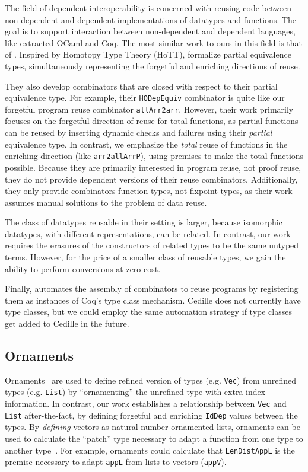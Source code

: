 \documentclass[acmsmall]{acmart}\settopmatter{}
\begin{document}
The field of dependent interoperability is concerned with reusing code
between non-dependent and dependent implementations of datatypes and
functions. The goal is to support interaction between non-dependent
and dependent languages, like extracted OCaml and Coq.
The most similar work to ours in this field is that of
\citet{dagand:interop}. Inspired by Homotopy Type Theory (HoTT),
\citet{dagand:interop} formalize partial equivalence types,
simultaneously representing the forgetful and enriching directions of reuse.

They also develop combinators that are closed with respect to their
partial equivalence type. For example, their \verb;HODepEquiv; combinator is
quite like our forgetful program reuse combinator
\verb;allArr2arr;. However, their work primarily focuses on the
forgetful direction of reuse for total functions, as partial functions
can be reused by inserting dynamic checks and failures using their
\textit{partial} equivalence type. In contrast, we emphasize the
\textit{total} reuse of functions in the enriching direction (like
\verb;arr2allArrP;), using premises to make the total functions
possible. Because they are primarily interested in program reuse, not
proof reuse, they do not provide dependent versions of their reuse
combinators. Additionally, they only provide combinators function
types, not fixpoint types, as their work assumes manual solutions to
the problem of data reuse.

The class of datatypes reusable in their setting is larger, because
isomorphic datatypes, with different representations, can be
related. In contrast, our work requires the erasures of the
constructors of related types to be the same untyped terms. However,
for the price of a smaller class of reusable types, we gain the
ability to perform conversions at zero-cost.

Finally, \citet{dagand:interop} automates the assembly of combinators
to reuse programs by registering them as instances of Coq's type
class mechanism. Cedille does not currently have type classes, but we could
employ the same automation strategy if type classes get added to
Cedille in the future.

\subsection{Ornaments}

Ornaments~\cite{ornaments:original} are used to define refined
version of types (e.g. \texttt{Vec}) from unrefined types
(e.g. \texttt{List}) by ``ornamenting'' the unrefined type with extra
index information. In contrast, our work establishes a relationship
between \texttt{Vec} and \texttt{List} after-the-fact, by defining
forgetful and enriching \verb;IdDep; values between the types.
By \textit{defining} vectors as natural-number-ornamented lists,
ornaments can be used to calculate the ``patch'' type necessary to adapt a
function from one type to another type~\cite{ornaments:functional}.
For example, ornaments could
calculate that \texttt{LenDistAppL} is the premise necessary to adapt
\texttt{appL} from lists to vectors (\texttt{appV}).
\end{document}
